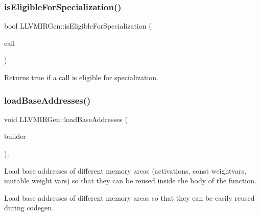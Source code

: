 \subsubsection{\texorpdfstring{is\+Eligible\+For\+Specialization()}{isEligibleForSpecialization()}}
{\footnotesize\ttfamily bool L\+L\+V\+M\+I\+R\+Gen\+::is\+Eligible\+For\+Specialization (\begin{DoxyParamCaption}\item[{const llvm\+::\+Call\+Inst $\ast$}]{call }\end{DoxyParamCaption})\hspace{0.3cm}{\ttfamily [virtual]}}

\begin{DoxyReturn}{Returns}
true if a call is eligible for specialization. 
\end{DoxyReturn}
\mbox{\label{classglow_1_1_l_l_v_m_i_r_gen_ac5f23be02496680d03496b598c653c49}} 
\subsubsection{\texorpdfstring{load\+Base\+Addresses()}{loadBaseAddresses()}}
{\footnotesize\ttfamily void L\+L\+V\+M\+I\+R\+Gen\+::load\+Base\+Addresses (\begin{DoxyParamCaption}\item[{llvm\+::\+I\+R\+Builder$<$$>$ \&}]{builder }\end{DoxyParamCaption})\hspace{0.3cm}{\ttfamily [protected]}, {\ttfamily [virtual]}}

Load base addresses of different memory areas (activations, const weightvars, mutable weight vars) so that they can be reused inside the body of the function.

Load base addresses of different memory areas so that they can be easily reused during codegen. \mbox{\label{classglow_1_1_l_l_v_m_i_r_gen_a044469a2bbd62d2ce24c1da0fce621a2}} 

